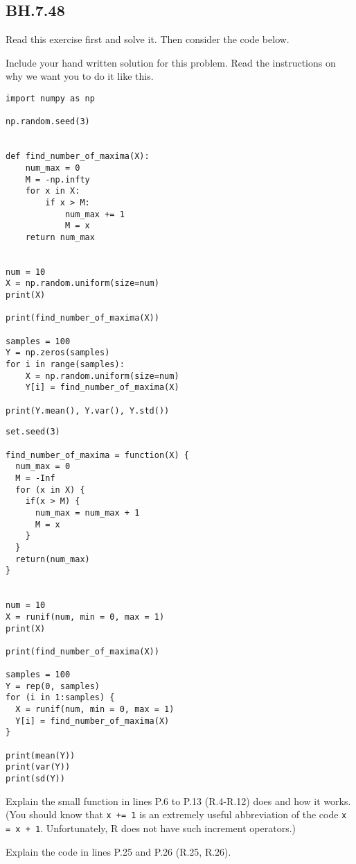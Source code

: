 \subsection{BH.7.48}

Read this exercise first and solve it. Then consider the code below.

\begin{exercise}
Include your hand written solution for this problem. Read the instructions on why we want you to do it like this.
\end{exercise}


\begin{verbatim}
import numpy as np

np.random.seed(3)


def find_number_of_maxima(X):
    num_max = 0
    M = -np.infty
    for x in X:
        if x > M:
            num_max += 1
            M = x
    return num_max


num = 10
X = np.random.uniform(size=num)
print(X)

print(find_number_of_maxima(X))

samples = 100
Y = np.zeros(samples)
for i in range(samples):
    X = np.random.uniform(size=num)
    Y[i] = find_number_of_maxima(X)

print(Y.mean(), Y.var(), Y.std())
\end{verbatim}


\begin{verbatim}
set.seed(3)

find_number_of_maxima = function(X) {
  num_max = 0
  M = -Inf
  for (x in X) {
    if(x > M) {
      num_max = num_max + 1
      M = x
    }
  }
  return(num_max)
}


num = 10
X = runif(num, min = 0, max = 1)
print(X)

print(find_number_of_maxima(X))

samples = 100
Y = rep(0, samples)
for (i in 1:samples) {
  X = runif(num, min = 0, max = 1)
  Y[i] = find_number_of_maxima(X)
}

print(mean(Y))
print(var(Y))
print(sd(Y))
\end{verbatim}

\begin{exercise}
Explain the small function in lines P.6 to P.13 (R.4-R.12) does and how it works.
(You should know that \texttt{x += 1} is an extremely useful abbreviation of the code \texttt{x = x + 1}. Unfortunately, R does not have such increment operators.)
\end{exercise}

\begin{exercise}
Explain the code in lines P.25 and P.26 (R.25, R.26).
\end{exercise}
